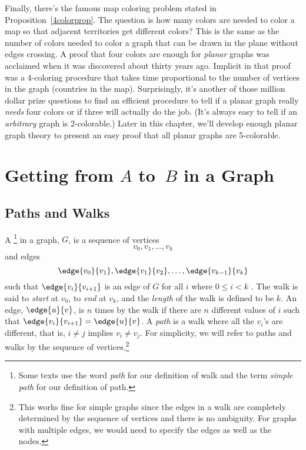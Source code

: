 Finally, there's the famous map coloring problem stated in
Proposition~\ref{4colorprop}.  The question is how many colors are
needed to color a map so that adjacent territories get different
colors?  This is the same as the number of colors needed to color a
graph that can be drawn in the plane without edges crossing.  A proof
that four colors are enough for \emph{planar} graphs was acclaimed
when it was discovered about thirty years ago.  Implicit in that proof
was a 4-coloring procedure that takes time proportional to the number
of vertices in the graph (countries in the map).  Surprisingly,
it's another of those million dollar prize questions to find an
efficient procedure to tell if a planar graph really \emph{needs} four
colors or if three will actually do the job.  (It's always easy to
tell if an \emph{arbitrary} graph is 2-colorable.)  Later in this
chapter, we'll develop enough planar graph theory to present an easy
proof that all planar graphs are 5-colorable.


\section{Getting from $A$ to~$B$ in a Graph}\label{sec:connectedness}

\subsection{Paths and Walks}

\begin{definition}\label{def:undirected-path}
A \footnote{Some texts use the word \emph{path} for our
  definition of walk and the term \emph{simple path} for our
  definition of path.} in a graph, $G$, is a sequence of vertices
\begin{equation*}
v_0, v_1, \dots, v_k
\end{equation*}
and edges
\begin{equation*}
    \edge{v_0}{v_1}, \edge{v_1}{v_2}, \dots, \edge{v_{k - 1}}{v_k}
\end{equation*}
such that $\edge{v_i}{v_{i+1}}$ is an edge of $G$ for all $i$ where $0
\leq i < k$ .  The walk is said to \emph{start}
at $v_0$, to \emph{end} at $v_k$, and the
\emph{length} of the walk is defined to be $k$.
An edge, $\edge{u}{v}$, is  $n$ times by the walk if
there are $n$ different values of $i$ such that $\edge{v_i}{v_{i+1}} =
\edge{u}{v}$.  A \emph{path} is a walk where all the $v_i$'s are
different, that is, $i\neq j$ implies $v_i \neq v_j$.  For simplicity,
we will refer to paths and walks by the sequence of
vertices.\footnote{This works fine for simple graphs since the edges
  in a walk are completely determined by the sequence of vertices and
  there is no ambiguity.  For graphs with multiple edges, we would
  need to specify the edges as well as the nodes.}
\end{definition}

